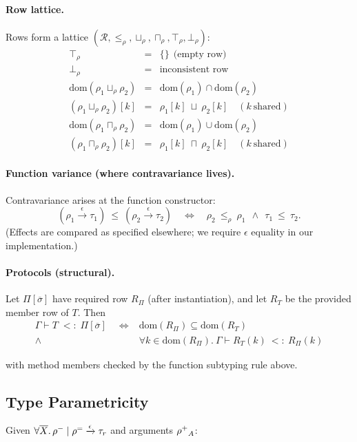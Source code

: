 \paragraph{Row lattice.}
Rows form a lattice $(\mathcal{R}, \le_\rho, \sqcup_\rho, \sqcap_\rho, \top_\rho, \bot_\rho)$:
\[
\begin{array}{lcl}
\top_\rho &=& \{\}\ \ \text{(empty row)}\\[0.2em]
\bot_\rho &=& \text{inconsistent row}\\[0.2em]
\mathrm{dom}(\rho_1 \sqcup_\rho \rho_2) &=& \mathrm{dom}(\rho_1)\cap\mathrm{dom}(\rho_2)\\
(\rho_1 \sqcup_\rho \rho_2)[k] &=& \rho_1[k]\ \sqcup\ \rho_2[k]\quad (k\ \text{shared})\\[0.2em]
\mathrm{dom}(\rho_1 \sqcap_\rho \rho_2) &=& \mathrm{dom}(\rho_1)\cup\mathrm{dom}(\rho_2)\\
(\rho_1 \sqcap_\rho \rho_2)[k] &=& \rho_1[k]\ \sqcap\ \rho_2[k]\quad (k\ \text{shared})
\end{array}
\]

\paragraph{Function variance (where contravariance lives).}
Contravariance arises at the function constructor:
\[
(\rho_1 \xrightarrow{\epsilon} \tau_1)\ \le\ (\rho_2 \xrightarrow{\epsilon} \tau_2)
\quad\iff\quad
\rho_2\ \le_\rho\ \rho_1\ \ \wedge\ \ \tau_1\ \le\ \tau_2.
\]
(Effects are compared as specified elsewhere; we require $\epsilon$ equality in our implementation.)

\paragraph{Protocols (structural).}
Let $\Pi[\overline{\sigma}]$ have required row $R_\Pi$ (after instantiation), and let $R_T$ be the provided member row of $T$.
Then
\begin{align*}
\Gamma \vdash T \;<:\; \Pi[\overline{\sigma}] \quad\iff & \mathrm{dom}(R_\Pi)\subseteq \mathrm{dom}(R_T) \\
\wedge \; & \forall k\in\mathrm{dom}(R_\Pi).\ \Gamma \vdash R_T(k)\ <: \ R_\Pi(k)
\end{align*}

with method members checked by the function subtyping rule above.

\subsection{Type Parametricity}
Given $\forall\overline{X}.\,\mathord{\rho^{-}} \mid \mathord{\rho^{=}} \xrightarrow{\epsilon} \tau_r$ and arguments $\mathord{\rho^{+}}_A$:

